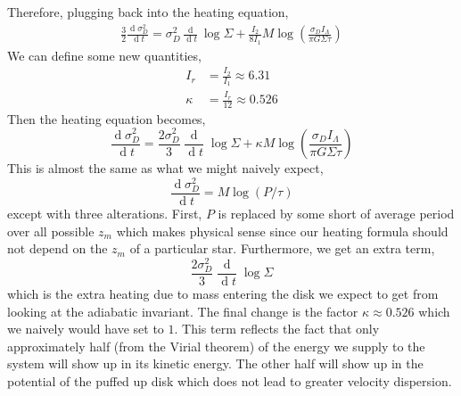\documentclass[usenatbib]{mnras}
\renewcommand{\d}[1]{\! \mathrm{d}#1 \:}
\newcommand{\deriv}[2]{\frac{\d{#1}}{\d{#2}}}
\renewcommand{\d}[1]{\ensuremath{\operatorname{d}\!{#1}}}
\begin{document}
Therefore, plugging back into the heating equation,
\begin{align}
\frac{3}{2} \deriv{\sigma_D^2}{t} = \sigma_D^2 \deriv{}{t} \log{\Sigma} + \frac{I_2}{8 I_1} M \log{\left( \frac{\sigma_D I_{\Lambda}}{\pi G \Sigma \tau} \right)}
\end{align}
We can define some new quantities,
\begin{align*}
I_r & = \frac{I_2}{I_1} \approx 6.31
\\
\kappa & = \frac{I_r}{12} \approx 0.526
\end{align*}
Then the heating equation becomes,
\begin{equation}
\deriv{\sigma_D^2}{t} = \frac{2\sigma_D^2}{3} \deriv{}{t} \log{\Sigma} + \kappa M \log{\left( \frac{\sigma_D I_{\Lambda}}{\pi G \Sigma \tau} \right)}
\end{equation}
This is almost the same as what we might naively expect,
\[ \deriv{\sigma_D^2}{t} = M \log{(P / \tau)} \]
except with three alterations. First, $P$ is replaced by some short of average period over all possible $z_m$ which makes physical sense since our heating formula should not depend on the $z_m$ of a particular star. Furthermore, we get an extra term,
\[ \frac{2\sigma_D^2}{3} \deriv{}{t} \log{\Sigma} \]
which is the extra heating due to mass entering the disk we expect to get from looking at the adiabatic invariant. The final change is the factor $\kappa \approx 0.526$ which we naively would have set to $1$. This term reflects the fact that only approximately half (from the Virial theorem) of the energy we supply to the system will show up in its kinetic energy. The other half will show up in the potential of the puffed up disk which does not lead to greater velocity dispersion.   


 
\end{document}
